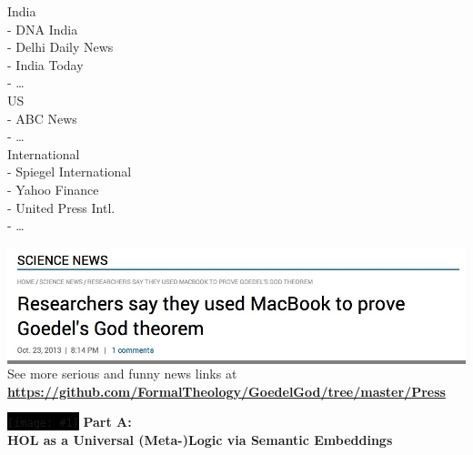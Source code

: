 \documentclass[9pt,mathserif,unknownkeysallowed,xcolor=dvipsnames]{beamer}
\newenvironment{transitionframe}[2]
{
\begin{frame}{} \Large
\centering
\colorbox{#2}{\texttt{[image: \#1]}}
\vfill
}
{

\end{frame}
}
\begin{document}
\begin{frame}{}
\begin{minipage}{.3\textwidth}

India \\
- DNA India \\
- Delhi Daily News \\
- India Today \\
- \ldots \\

US \\
- ABC News \\
- \ldots \\

International \\
- Spiegel International \\
- Yahoo Finance \\
- United Press Intl. \\
- \ldots \\
\end{minipage}
\end{frame}

\begin{frame} \large
\colorbox{gray}{\includegraphics[width=\textwidth]{./Images/News/MacBookGrab}} 
\vfill
\normalsize
See more serious and funny news links at \\ 
\textbf{\url{https://github.com/FormalTheology/GoedelGod/tree/master/Press}}
\end{frame}



\begin{transitionframe}{./Images/open-brain}{black}%
  \centering
 \textbf{Part A: \\ HOL as a Universal (Meta-)Logic via Semantic Embeddings}
\end{transitionframe}
\end{document}
